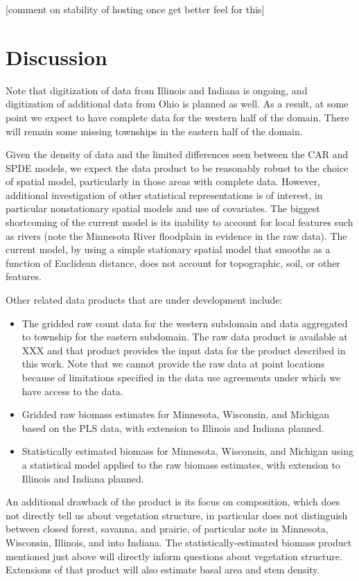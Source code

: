 \documentclass[12pt]{article}\usepackage[]{graphicx}\usepackage[]{color}
\begin{document}
{[}comment on stability of hosting once get better feel for this{]}


\section{Discussion}

Note that digitization of data from Illinois and Indiana is ongoing,
and digitization of additional data from Ohio is planned as well.
As a result, at some point we expect to have complete data for the
western half of the domain. There will remain some missing townships
in the eastern half of the domain. 

Given the density of data and the limited differences seen between
the CAR and SPDE models, we expect the data product to be reasonably
robust to the choice of spatial model, particularly in those areas
with complete data. However, additional investigation of other statistical
representations is of interest, in particular nonstationary spatial
models and use of covariates. The biggest shortcoming of the current
model is its inability to account for local features such as rivers
(note the Minnesota River floodplain in evidence in the raw data).
The current model, by using a simple stationary spatial model that
smooths as a function of Euclidean distance, does not account for
topographic, soil, or other features. 

Other related data products that are under development include:
\begin{itemize}
\item The gridded raw count data for the western subdomain and data aggregated
to township for the eastern subdomain. The raw data product is available
at XXX and that product provides the input data for the product described
in this work. Note that we cannot provide the raw data at point locations
because of limitations specified in the data use agreements under
which we have access to the data.
\item Gridded raw biomass estimates for Minnesota, Wisconsin, and Michigan
based on the PLS data, with extension to Illinois and Indiana planned.
\item Statistically estimated biomass for Minnesota, Wisconsin, and Michigan
using a statistical model applied to the raw biomass estimates, with
extension to Illinois and Indiana planned.
\end{itemize}
An additional drawback of the product is its focus on composition,
which does not directly tell us about vegetation structure, in particular
does not distinguish between closed forest, savanna, and prairie,
of particular note in Minnesota, Wisconsin, Illinois, and into Indiana.
The statistically-estimated biomass product mentioned just above will
directly inform questions about vegetation structure. Extensions of
that product will also estimate basal area and stem density. 
\end{document}
